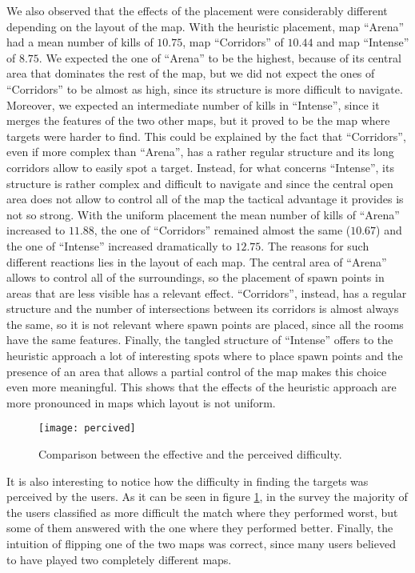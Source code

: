 We also observed that the effects of the placement were considerably different depending on the layout of the map. With the heuristic placement, map ``Arena'' had a mean number of kills of $10.75$, map ``Corridors'' of $10.44$ and map ``Intense'' of $8.75$. We expected the one of ``Arena'' to be the highest, because of its central area that dominates the rest of the map, but we did not expect the ones of ``Corridors'' to be almost as high, since its structure is more difficult to navigate. Moreover, we expected an intermediate number of kills in ``Intense'', since it merges the features of the two other maps, but it proved to be the map where targets were harder to find. This could be explained by the fact that ``Corridors'', even if more complex than ``Arena'', has a rather regular structure and its long corridors allow to easily spot a target. Instead, for what concerns ``Intense'', its structure is rather complex and difficult to navigate and since the central open area does not allow to control all of the map the tactical advantage it provides is not so strong. With the uniform placement the mean number of kills of ``Arena'' increased to $11.88$, the one of ``Corridors'' remained almost the same ($10.67$) and the one of ``Intense'' increased dramatically to $12.75$. The reasons for such different reactions lies in the layout of each map. The central area of ``Arena'' allows to control all of the surroundings, so the placement of spawn points in areas that are less visible has a relevant effect. ``Corridors'', instead, has a regular structure and the number of intersections between its corridors is almost always the same, so it is not relevant where spawn points are placed, since all the rooms have the same features. Finally, the tangled structure of ``Intense'' offers to the heuristic approach a lot of interesting spots where to place spawn points and the presence of an area that allows a partial control of the map makes this choice even more meaningful. This shows that the effects of the heuristic approach are more pronounced in maps which layout is not uniform.

\begin{figure}
\centering
\texttt{[image: percived]}
\caption{Comparison between the effective and the perceived difficulty.}
\label{img:percived} 
\end{figure}

It is also interesting to notice how the difficulty in finding the targets was perceived by the users. As it can be seen in figure \ref{img:percived}, in the survey the majority of the users classified as more difficult the match where they performed worst, but some of them answered with the one where they performed better. Finally, the intuition of flipping one of the two maps was correct, since many users believed to have played two completely different maps. 

